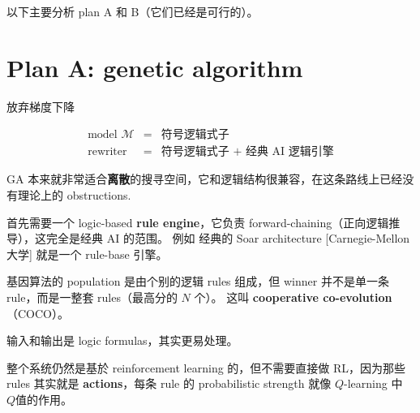 \documentclass[12pt, orivec]{article}
\begin{document}
以下主要分析 plan A 和 B（它们已经是可行的）。

\section{Plan A: genetic algorithm}
\label{COCO}

\begin{tcolorbox}[ams equation, colback=yellow, colframe=white]
\mbox{放弃梯度下降}
\end{tcolorbox}
\begin{eqnarray}
\mbox{model } \mathcal{M} &=& \mbox{符号逻辑式子} \nonumber \\
\mbox{rewriter} &=& \mbox{符号逻辑式子 + 经典 AI 逻辑引擎}
\end{eqnarray}

GA 本来就非常适合\textbf{离散}的搜寻空间，它和逻辑结构很兼容，在这条路线上已经没有理论上的 obstructions. 



首先需要一个 logic-based \textbf{rule engine}，它负责 forward-chaining（正向逻辑推导），这完全是经典 AI 的范围。 例如 经典的 Soar architecture [Carnegie-Mellon 大学] 就是一个 rule-base 引擎。 %


基因算法的 population 是由个别的逻辑 rules 组成，但 winner 并不是单一条 rule，而是一整套 rules（最高分的 $N$ 个）。 这叫 \textbf{cooperative co-evolution}（COCO）。  

输入和输出是 logic formulas，其实更易处理。 

整个系统仍然是基於 reinforcement learning 的，但不需要直接做 RL，因为那些 rules 其实就是 \textbf{actions}，每条 rule  的 probabilistic strength 就像 $Q$-learning 中 $Q$值的作用。 
\end{document}
